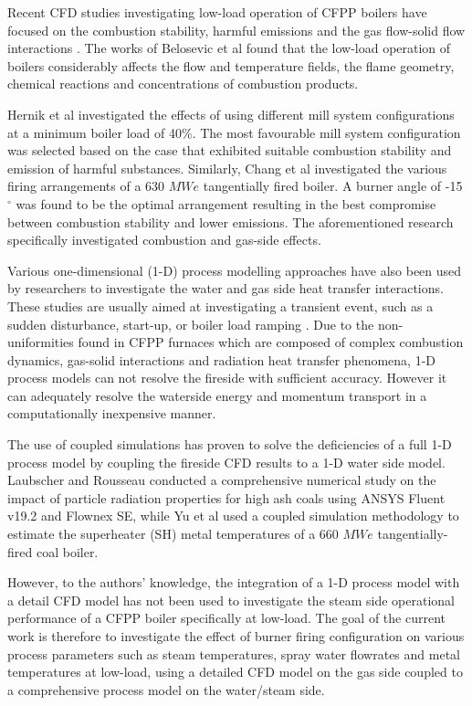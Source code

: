 \documentclass[11pt,cleanfoot]{asme2ej}
\begin{document}
Recent CFD studies investigating low-load operation of CFPP boilers have focused on the combustion stability, harmful emissions and the gas flow-solid flow interactions \cite{Jiang2021}. The works of Belosevic et al \cite{Belosevic2019a} found that the low-load operation of boilers considerably affects the flow and temperature fields, the flame geometry, chemical reactions and concentrations of combustion products.

Hernik et al \cite{Hernik2020} investigated the effects of using different mill system configurations at a minimum boiler load of 40\%. The most favourable mill system configuration was selected based on the case that exhibited suitable combustion stability and emission of harmful substances. Similarly, Chang et al \cite{Chang2021} investigated the various firing arrangements of a 630 $MWe$ tangentially fired boiler. A burner angle of -15 $^\circ$ was found to be the optimal arrangement resulting in the best compromise between combustion stability and lower emissions. The aforementioned research specifically investigated combustion and gas-side effects.

Various one-dimensional (1-D) process modelling approaches have also been used by researchers to investigate the water and gas side heat transfer interactions. These studies are usually aimed at investigating a transient event, such as a sudden disturbance, start-up, or boiler load ramping \cite{Alobaid2017}. Due to the non-uniformities found in CFPP furnaces which are composed of complex combustion dynamics, gas-solid interactions and  radiation heat transfer phenomena, 1-D process models can not resolve the fireside with sufficient accuracy. However it can adequately resolve the waterside energy and momentum transport in a computationally inexpensive manner.

The use of coupled simulations has proven to solve the deficiencies of a full 1-D process model by coupling the fireside CFD results to a 1-D water side model. Laubscher and Rousseau \cite{Laubscher2020} conducted a comprehensive numerical study on the impact of particle radiation properties for high ash coals using ANSYS Fluent v19.2\textsuperscript{\textregistered} and Flownex SE\textsuperscript{\textregistered}, while Yu et al \cite{Yu2019} used a coupled simulation methodology to estimate the superheater (SH) metal temperatures of a 660 $MWe$ tangentially-fired coal boiler.

However, to the authors’ knowledge, the integration of a 1-D process model with a detail CFD model has not been used to investigate the steam side operational performance of a CFPP boiler specifically at low-load. The goal of the current work is therefore to investigate the effect of burner firing configuration on various process parameters such as steam temperatures, spray water flowrates and metal temperatures at low-load, using a detailed CFD model on the gas side coupled to a comprehensive process model on the water/steam side.
\end{document}
